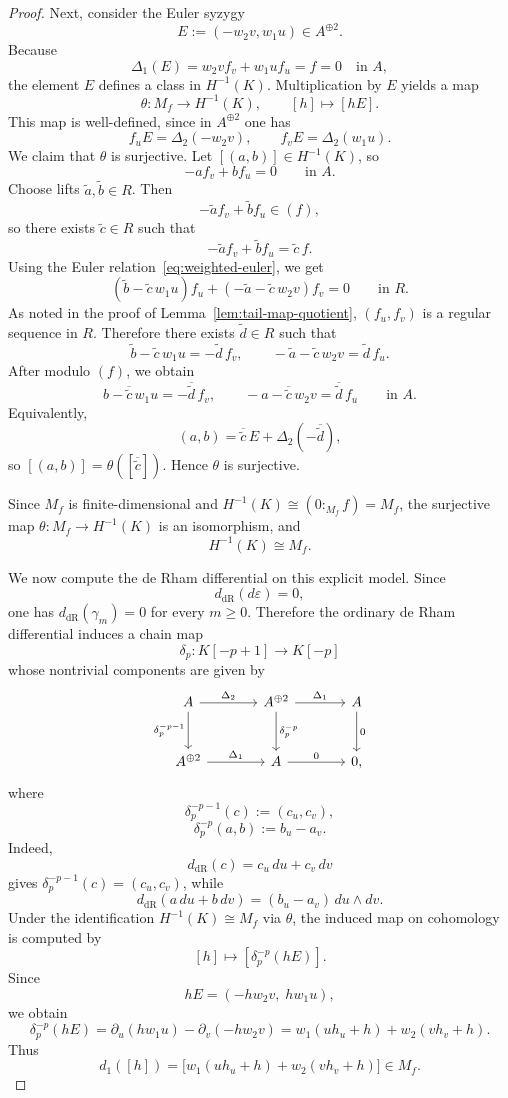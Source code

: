 \documentclass[10pt,a4paper]{amsart}
\renewcommand{\ge}{\geqslant}
\begin{document}
\begin{proof}
Next, consider the Euler syzygy
\[
E:=(-w_2v,w_1u)\in A^{\oplus 2}.
\]
Because
\[
\Delta_1(E)=w_2v f_v+w_1u f_u=f=0\quad\text{in }A,
\]
the element $E$ defines a class in $H^{-1}(K)$. Multiplication by $E$ yields a map
\[
\theta:M_f\longrightarrow H^{-1}(K),\qquad [h]\longmapsto [hE].
\]
This map is well-defined, since in \(A^{\oplus 2}\) one has
\[
f_uE=\Delta_2(-w_2v),
\qquad
f_vE=\Delta_2(w_1u).
\]
We claim that \(\theta\) is surjective. Let \([(a,b)]\in H^{-1}(K)\), so
\[
-af_v+bf_u=0
\qquad\text{in }A.
\]
Choose lifts \(\widetilde a,\widetilde b\in R\). Then
\[
-\widetilde a f_v+\widetilde b f_u\in (f),
\]
so there exists \(\widetilde c\in R\) such that
\[
-\widetilde a f_v+\widetilde b f_u=\widetilde c\,f.
\]
Using the Euler relation~\eqref{eq:weighted-euler}, we get
\[
(\widetilde b-\widetilde c\,w_1u)f_u+(-\widetilde a-\widetilde c\,w_2v)f_v=0
\qquad\text{in }R.
\]
As noted in the proof of Lemma~\ref{lem:tail-map-quotient}, \((f_u,f_v)\) is a regular sequence in \(R\). Therefore there exists \(\widetilde d\in R\) such that
\[
\widetilde b-\widetilde c\,w_1u=-\widetilde d\,f_v,
\qquad
-\widetilde a-\widetilde c\,w_2v=\widetilde d\,f_u.
\]
After modulo \((f)\), we obtain
\[
b-\overline{\widetilde c}\,w_1u=-\overline{\widetilde d}\,f_v,
\qquad
-a-\overline{\widetilde c}\,w_2v=\overline{\widetilde d}\,f_u
\qquad
\text{in }
A.
\]
Equivalently,
\[
(a,b)=\overline{\widetilde c}\,E+\Delta_2(-\overline{\widetilde d}),
\]
so \([(a,b)]=\theta([\overline{\widetilde c}])\). Hence \(\theta\) is surjective.

Since \(M_f\) is finite-dimensional and \(H^{-1}(K)\cong (0:_{M_f}f)=M_f\), the surjective map \(\theta:M_f\to H^{-1}(K)\) is an isomorphism, and
\[
H^{-1}(K)\cong M_f.
\]

We now compute the de Rham differential on this explicit model. Since
\[
d_{\mathrm{dR}}(d\varepsilon)=0,
\]
one has \(d_{\mathrm{dR}}(\gamma_m)=0\) for every \(m\ge 0\). Therefore the ordinary de Rham differential induces a chain map
\[
\delta_p:K[-p+1]\longrightarrow K[-p]
\]
whose nontrivial components are given by
\[
\begin{tikzcd}[column sep=large, row sep=large]
A
  \arrow[r, "\Delta_2"]
  \arrow[d, "\delta_p^{-p-1}" left]
&
A^{\oplus 2}
  \arrow[r, "\Delta_1"]
  \arrow[d, "\delta_p^{-p}"]
&
A
  \arrow[d, "0"]
\\
A^{\oplus 2}
  \arrow[r, "\Delta_1"]
&
A
  \arrow[r, "0"]
&
0,
\end{tikzcd}
\]
where
\[
\delta_p^{-p-1}(c):=(c_u,c_v),
\]
\[
\delta_p^{-p}(a,b):=b_u-a_v.
\]
Indeed,
\[
d_{\mathrm{dR}}(c)=c_u\,du+c_v\,dv
\]
gives \(\delta_p^{-p-1}(c)=(c_u,c_v)\), while
\[
d_{\mathrm{dR}}(a\,du+b\,dv)=(b_u-a_v)\,du\wedge dv.
\]
Under the identification \(H^{-1}(K)\cong M_f\) via \(\theta\), the induced map on cohomology is computed by
\[
[h]\longmapsto [\delta_p^{-p}(hE)].
\]
Since
\[
hE=(-h w_2v,\; h w_1u),
\]
we obtain
\[
\delta_p^{-p}(hE)=\partial_u(hw_1u)-\partial_v(-hw_2v)
=
w_1(uh_u+h)+w_2(vh_v+h).
\]
Thus
\[
d_1([h])
=
\bigl[w_1(uh_u+h)+w_2(vh_v+h)\bigr]
\in M_f.
\]


\end{proof}
\end{document}
